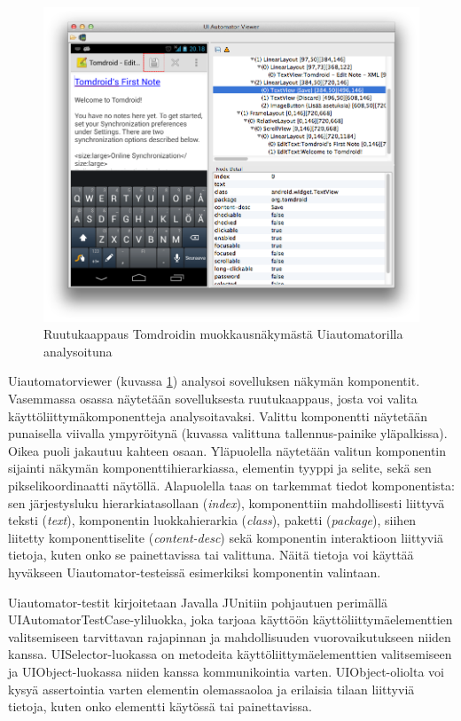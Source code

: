 \begin{figure}[h]
\centering
\includegraphics[width=160mm]{uiautomatorviewer.png}
\caption{Ruutukaappaus Tomdroidin muokkausnäkymästä Uiautomatorilla analysoituna} \label{uiautomatorviewer}
\end{figure}

Uiautomatorviewer (kuvassa \ref{uiautomatorviewer}) analysoi sovelluksen näkymän komponentit. Vasemmassa osassa näytetään sovelluksesta ruutukaappaus, josta voi valita käyttöliittymäkomponentteja analysoitavaksi. Valittu komponentti näytetään punaisella viivalla ympyröitynä (kuvassa valittuna tallennus-painike yläpalkissa). Oikea puoli jakautuu kahteen osaan. Yläpuolella näytetään valitun komponentin sijainti näkymän komponenttihierarkiassa, elementin tyyppi ja selite, sekä sen pikselikoordinaatti näytöllä. Alapuolella taas on tarkemmat tiedot komponentista: sen järjestysluku hierarkiatasollaan (\emph{index}), komponenttiin mahdollisesti liittyvä teksti (\emph{text}), komponentin luokkahierarkia (\emph{class}), paketti (\emph{package}), siihen liitetty komponenttiselite (\emph{content-desc}) sekä komponentin interaktioon liittyviä tietoja, kuten onko se painettavissa tai valittuna. Näitä tietoja voi käyttää hyväkseen Uiautomator-testeissä esimerkiksi komponentin valintaan.

Uiautomator-testit kirjoitetaan Javalla JUnitiin pohjautuen perimällä UIAutomatorTestCase-yliluokka, joka tarjoaa käyttöön käyttöliittymäelementtien valitsemiseen tarvittavan rajapinnan ja mahdollisuuden vuorovaikutukseen niiden kanssa. UISelector-luokassa on metodeita käyttöliittymäelementtien valitsemiseen ja UIObject-luokassa niiden kanssa kommunikointia varten. UIObject-oliolta voi kysyä assertointia varten elementin olemassaoloa ja erilaisia tilaan liittyviä tietoja, kuten onko elementti käytössä tai painettavissa.

